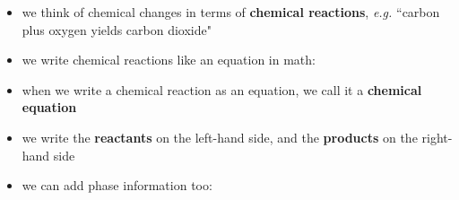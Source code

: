\documentclass[11pt, oneside]{article}   	%
\begin{document}
\begin{itemize}
\item we think of chemical changes in terms of \textbf{chemical reactions}, \emph{e.g.} ``carbon plus oxygen yields carbon dioxide"
\item we write chemical reactions like an equation in math: 
\begin{center}
\end{center}
\item when we write a chemical reaction as an equation, we call it a \textbf{chemical equation}
\item we write the \textbf{reactants} on the left-hand side, and the \textbf{products} on the right-hand side
\item we can add phase information too: 
\begin{center}
\end{center}
\end{itemize}
\end{document}
